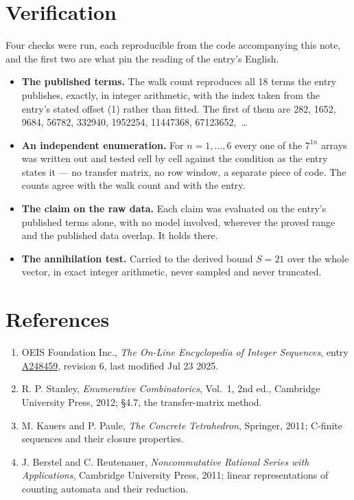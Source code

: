 \documentclass[11pt]{article}
\theoremstyle{definition}
\begin{document}
\section{Verification}

Four checks were run, each reproducible from the code accompanying this note, and the first two are what pin the reading of the entry's English.

\begin{itemize}

\item {\bfseries The published terms.} The walk count reproduces all 18 terms the entry publishes, exactly, in integer arithmetic, with the index taken from the entry's stated offset (1) rather than fitted. The first of them are 282, 1652, 9684, 56782, 332940, 1952254, 11447368, 67123652,~\dots

\item {\bfseries An independent enumeration.} For $n = 1,\dots,6$ every one of the $7^{1n}$ arrays was written out and tested cell by cell against the condition as the entry states it --- no transfer matrix, no row window, a separate piece of code. The counts agree with the walk count and with the entry.

\item {\bfseries The claim on the raw data.} Each claim was evaluated on the entry's published terms alone, with no model involved, wherever the proved range and the published data overlap. It holds there.

\item {\bfseries The annihilation test.} Carried to the derived bound $S = 21$ over the whole vector, in exact integer arithmetic, never sampled and never truncated.

\end{itemize}

\section{References}

\begin{enumerate}

\item OEIS Foundation Inc., \emph{The On-Line Encyclopedia of Integer Sequences}, entry \href{https://oeis.org/A248459}{A248459}, revision 6, last modified Jul 23 2025.

\item R. P. Stanley, \emph{Enumerative Combinatorics}, Vol.~1, 2nd ed., Cambridge University Press, 2012; \S4.7, the transfer-matrix method.

\item M. Kauers and P. Paule, \emph{The Concrete Tetrahedron}, Springer, 2011; C-finite sequences and their closure properties.

\item J. Berstel and C. Reutenauer, \emph{Noncommutative Rational Series with Applications}, Cambridge University Press, 2011; linear representations of counting automata and their reduction.

\end{enumerate}
\end{document}
